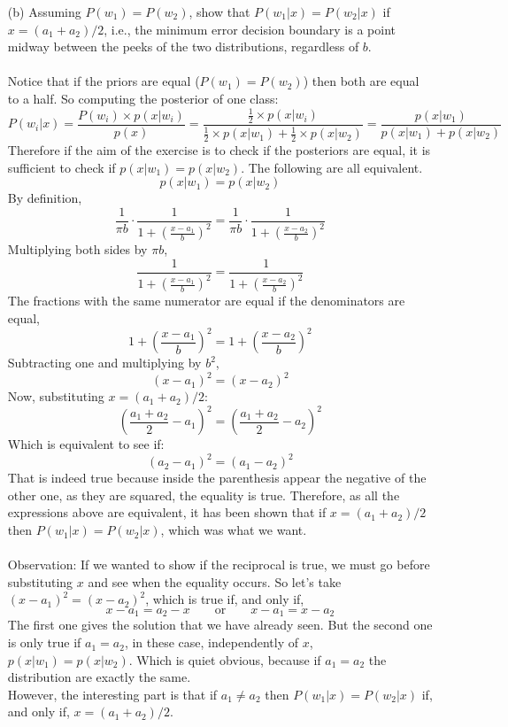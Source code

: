 \documentclass[10pt]{article}
\begin{document}
\begin{enumerate}
\Large
  \item[(b)] Assuming $P(w_1)=P(w_2)$, show that $P(w_1|x)=P(w_2|x)$ if $x=(a_1 + a_2)/2$, i.e., the minimum error decision boundary is a point midway between the peeks of the two distributions, regardless of $b$. \\ \ \\
\normalsize
Notice that if the priors are equal ($P(w_1)=P(w_2)$) then both are equal to a half. So computing the posterior of one class:
$$
P(w_i|x) = \frac{P(w_i)\times p(x|w_i)}{p(x)} = \frac{\frac{1}{2}\times p(x|w_i)}{\frac{1}{2}\times p(x|w_1) + \frac{1}{2}\times p(x|w_2)} = \frac{ p(x|w_1)}{ p(x|w_1) + p(x|w_2)}
$$
Therefore if the aim of the exercise is to check if the posteriors are equal, it is sufficient to check if $p(x|w_1)=p(x|w_2)$. The following are all equivalent.
$$
p(x|w_1)=p(x|w_2)
$$
By definition,
$$
\frac{1}{\pi b} \cdot \frac{1}{1 + \left(\frac{x-a_1}{b}\right)^2}=\frac{1}{\pi b} \cdot \frac{1}{1 + \left(\frac{x-a_2}{b}\right)^2}
$$
Multiplying both sides by $\pi b$,
$$
\frac{1}{1 + \left(\frac{x-a_1}{b}\right)^2}= \frac{1}{1 + \left(\frac{x-a_2}{b}\right)^2}
$$
The fractions with the same numerator are equal if the denominators are equal,
$$
1 + \left(\frac{x-a_1}{b}\right)^2= 1 + \left(\frac{x-a_2}{b}\right)^2
$$
Subtracting one and multiplying by $b^2$,
$$
(x-a_1)^2=(x-a_2)^2
$$
Now, substituting $x=(a_1 + a_2)/2$:
$$
\left(\frac{a_1+a_2}{2}-a_1\right)^2=\left(\frac{a_1+a_2}{2}-a_2\right)^2
$$
Which is equivalent to see if:
$$
(a_2-a_1)^2=(a_1-a_2)^2
$$
That is indeed true because inside the parenthesis appear the negative of the other one, as they are squared, the equality is true. Therefore, as all the expressions above are equivalent, it has been shown that if $x=(a_1+a_2)/2$ then $P(w_1|x)=P(w_2|x)$, which was what we want. \\ \ \\
\color{blue}Observation: \color{black} If we wanted to show if the reciprocal is true, we must go before substituting $x$ and see when the equality occurs. So let's take $(x-a_1)^2=(x-a_2)^2$, which is true if, and only if,
$$
x-a_1=a_2-x \qquad \text{or} \qquad x-a_1 = x-a_2
$$
The first one gives the solution that we have already seen. But the second one is only true if $a_1=a_2$, in these case, independently of $x$, $p(x|w_1)=p(x|w_2)$. Which is quiet obvious, because if $a_1=a_2$ the distribution are exactly the same. \\

However, the interesting part is that if $a_1 \neq a_2$ then $P(w_1|x)=P(w_2|x)$ if, and only if, $x=(a_1+a_2)/2$.


\end{enumerate}
\end{document}
